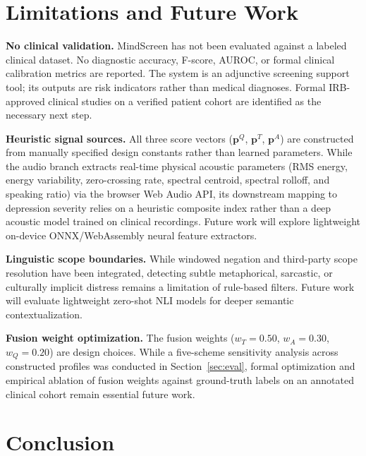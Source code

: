 \documentclass[10pt, conference, letterpaper]{IEEEtran}
\begin{document}
\section{Limitations and Future Work}
\label{sec:limitations}

\textbf{No clinical validation.}
MindScreen has not been evaluated against a labeled clinical dataset.
No diagnostic accuracy, F-score, AUROC, or formal clinical calibration metrics
are reported.
The system is an adjunctive screening support tool; its outputs are risk
indicators rather than medical diagnoses.
Formal IRB-approved clinical studies on a verified patient cohort are identified
as the necessary next step.

\textbf{Heuristic signal sources.}
All three score vectors ($\mathbf{p}^Q$, $\mathbf{p}^T$, $\mathbf{p}^A$) are
constructed from manually specified design constants rather than learned parameters.
While the audio branch extracts real-time physical acoustic parameters
(RMS energy, energy variability, zero-crossing rate, spectral centroid, spectral
rolloff, and speaking ratio) via the browser Web Audio API, its downstream mapping
to depression severity relies on a heuristic composite index rather than a deep
acoustic model trained on clinical recordings.
Future work will explore lightweight on-device ONNX/WebAssembly neural feature
extractors.

\textbf{Linguistic scope boundaries.}
While windowed negation and third-party scope resolution have been integrated,
detecting subtle metaphorical, sarcastic, or culturally implicit distress
remains a limitation of rule-based filters.
Future work will evaluate lightweight zero-shot NLI models for deeper semantic
contextualization.

\textbf{Fusion weight optimization.}
The fusion weights ($w_T=0.50$, $w_A=0.30$, $w_Q=0.20$) are design choices.
While a five-scheme sensitivity analysis across constructed profiles was
conducted in Section~\ref{sec:eval}, formal optimization and empirical ablation
of fusion weights against ground-truth labels on an annotated clinical cohort
remain essential future work.

\balance
\section{Conclusion}
\label{sec:conclusion}
\end{document}
